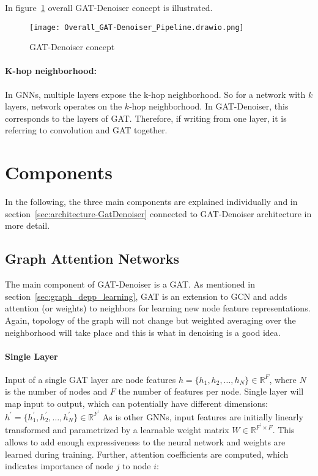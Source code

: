 In figure~\ref{fig:overall-concept} overall GAT-Denoiser concept is illustrated.
\begin{figure}[t]
  \centering
  \label{fig:overall-concept}
  \texttt{[image: Overall\_GAT-Denoiser\_Pipeline.drawio.png]}
  \caption{GAT-Denoiser concept}
\end{figure}



\paragraph{K-hop neighborhood:}
In GNNs, multiple layers expose the k-hop neighborhood. So for a network with $k$ layers,
network operates on the $k$-hop neighborhood. In GAT-Denoiser, this corresponds
to the layers of GAT. Therefore, if writing from one layer, it is referring to convolution and GAT together.

\section{Components}
In the following, the three main components are explained individually
and in section~\ref{sec:architecture-GatDenoiser} \textit{}
connected to GAT-Denoiser architecture in more detail.

\subsection{Graph Attention Networks}
The main component of GAT-Denoiser is a GAT.
As mentioned in section~\ref{sec:graph_depp_learning}, GAT is an extension to GCN and 
adds attention (or weights) to neighbors for learning new node feature representations. 
Again, topology of the graph will not change but weighted averaging over the neighborhood 
will take place and this is what in denoising is a good idea.

\paragraph{Single Layer}
Input of a single GAT layer are node features $h = \{ h_1, h_2, \dots , h_N \} \in \mathbb{R}^F$, 
where $N$ is the number of nodes and $F$ the number of features per node. 
Single layer will map input to output, which can potentially have different dimensions: 
$h^{\prime} = \{ h_1^{\prime}, h_2^{\prime}, \dots, h_N^{\prime} \} \in \mathbb{R}^{F^{\prime}} $
As is other GNNs, input features are initially linearly transformed and parametrized by a learnable weight matrix 
$W \in \mathbb{R}^{F^{\prime} \times F}$. 
This allows to add enough expressiveness to the neural network and weights are learned during training.
Further, attention coefficients are computed, which indicates importance of node $j$ to node $i$:

